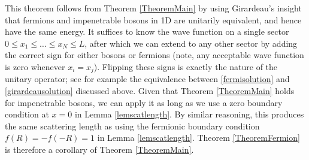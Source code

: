 \documentclass[a4paper,11pt]{article}
\numberwithin{equation}{section}
\begin{document}
	This theorem follows from Theorem \ref{TheoremMain} by using Girardeau's insight \cite{girardeau1960relationship} that fermions and impenetrable bosons in 1D are unitarily equivalent, and hence have the same energy. It suffices to know the wave function on a single sector $0\leq x_1\leq \dots\leq x_N\leq L$, after which we can extend to any other sector by adding the correct sign for either bosons or fermions (note, any acceptable wave function is zero whenever $x_i=x_j$). Flipping these signs is exactly the nature of the unitary operator; see for example the equivalence between \eqref{fermisolution} and \eqref{girardeausolution} discussed above. Given that Theorem \ref{TheoremMain} holds for impenetrable bosons, we can apply it as long as we use a zero boundary condition at $x=0$ in Lemma \ref{lemscatlength}. By similar reasoning, this produces the same scattering length as using the fermionic boundary condition $f(R)=-f(-R)=1$ in Lemma \ref{lemscatlength}. Theorem \ref{TheoremFermion} is therefore a corollary of Theorem \ref{TheoremMain}.
	
\end{document}
